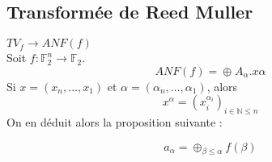 \subsection{Transformée de Reed Muller}
$TV_f\rightarrow ANF(f)$\\
Soit $f:\mathbb{F}_2^n\rightarrow\mathbb{F}_2$.\\
\begin{equation}
 ANF(f)=\oplus_{}A_\alpha.x\alpha
\end{equation}
Si $x=(x_n,\ldots,x_1)$ et $\alpha=(\alpha_n,\ldots,\alpha_1)$, alors 
\begin{equation}
 x^\alpha=\left(x_i^{\alpha_i}\right)_{i\in\mathbb{N}\leqslant n}
\end{equation}
On en déduit alors la proposition suivante : 
\begin{prop}
 \begin{equation}
  a_\alpha=\oplus_{\beta\leqslant\alpha}f\left(\beta\right)
 \end{equation}
\end{prop}
